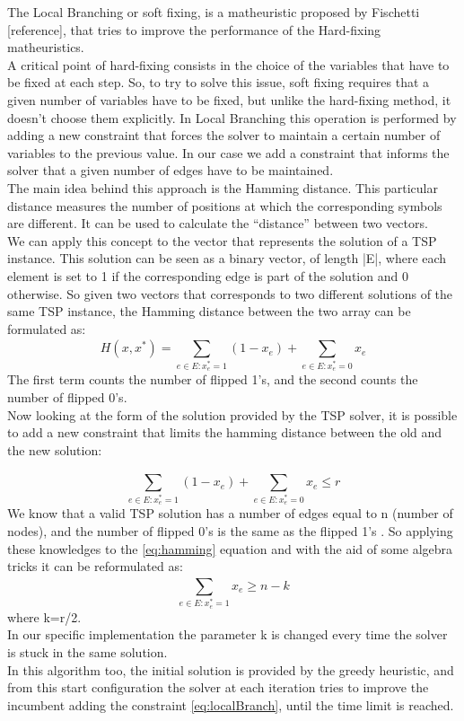 The Local Branching or soft fixing, is a matheuristic proposed by Fischetti [reference], that tries to improve the performance of the Hard-fixing matheuristics.\\
A critical point of hard-fixing consists in the choice of the variables that have to be fixed at each step. So, to try to solve this issue, soft fixing requires that a given number of variables have to be fixed, but unlike the hard-fixing method, it doesn’t choose them explicitly. In Local Branching this operation is performed by adding a new constraint that forces the solver to maintain a certain number of variables to the previous value. In our case we add a constraint that informs the solver that a given number of edges have to be maintained. \\
The main idea behind this approach is the Hamming distance. This particular distance measures the number of positions at which the corresponding symbols are different. It can be used to calculate the “distance” between two vectors. \\
We can apply this concept to the vector that represents the solution of a TSP instance. This solution can be seen as a binary vector, of length |E|, where each element is set to 1 if the corresponding edge is part of the solution and 0 otherwise. So given two vectors that corresponds to two different solutions of the same TSP instance, the Hamming distance between the two array can be formulated as:
\begin{equation}
   H(x,x^*)= \sum_{e\in E: x_e^*=1}^{}(1-x_e) + \sum_{e\in E: x_e^*=0}^{}x_e
\end{equation}
The first term counts the number of flipped 1’s, and the second counts the number of flipped 0’s. \\
Now looking at the form of the solution provided by the TSP solver, it is possible to add a new constraint that limits the hamming distance between the old and the new solution:

\begin{equation}\label{eq:hamming}
    \sum_{e\in E: x_e^*=1}^{}(1-x_e) + \sum_{e\in E: x_e^*=0}^{}x_e \leq r
\end{equation}
We know that a valid TSP solution has a number of edges equal to n (number of nodes), and the number of flipped 0’s is the same as the flipped 1’s . So applying these knowledges to the \ref{eq:hamming} equation and with the aid of some algebra tricks it can be reformulated as:
\begin{equation}\label{eq:localBranch}
    \sum_{e\in E: x_e^*=1}^{}x_e \geq n-k
\end{equation}
where k=r/2.
\\
In our specific implementation the parameter k is changed every time the solver is stuck in the same solution. \\
In this algorithm too, the initial solution is provided by the greedy heuristic, and from this start configuration the solver at each iteration tries to improve the incumbent adding the constraint \ref{eq:localBranch}, until the time limit is reached.


